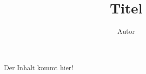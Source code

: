 \documentclass[11pt,a4paper]{article}
\author{Autor}
\title{Titel}
\begin{document}
 
 Der Inhalt kommt hier!

 
\end{document}
